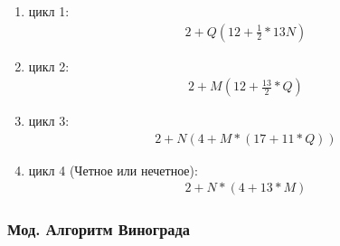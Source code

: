 \documentclass[a4paper, 14pt]{article}
\begin{document}
	\begin{enumerate}
		
		\item цикл 1: \\
		\begin{equation}\boxed{\begin{aligned}
				2 + Q(12 + \frac{1}{2} * 13N)
			\end{aligned}}
		\end{equation}
		
		\item цикл 2:
		\begin{equation}\boxed{\begin{aligned}
			2 + M(12 + \frac{13}{2} * Q)
			\end{aligned}}
		\end{equation}
		
		\item цикл 3:
		\begin{equation}\boxed{\begin{aligned}
			2 + N(4 + M *(17 + 11 * Q))
			\end{aligned}}
		\end{equation}
		
		\item цикл 4 (Четное или нечетное):
		\begin{equation}\boxed{\begin{aligned}
			2 + N * (4 + 13 * M)
			\end{aligned}}
		\end{equation}
		
	\end{enumerate}
	
		
	
	\subsubsection{Мод. Алгоритм Винограда}
	
\end{document}
